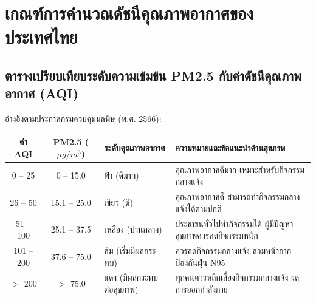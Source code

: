 \chapter{เกณฑ์การคำนวณดัชนีคุณภาพอากาศของประเทศไทย}
\label{app:appendixB}

\section{ตารางเปรียบเทียบระดับความเข้มข้น PM2.5 กับค่าดัชนีคุณภาพอากาศ (AQI)}
อ้างอิงตามประกาศกรมควบคุมมลพิษ (พ.ศ. 2566):

\begin{table}[H]
\centering\small
\begin{tabularx}{\textwidth}{c c p{} X}
\toprule
\textbf{ค่า AQI} & \textbf{PM2.5 ($\mu g/m^3$)} & \textbf{ระดับคุณภาพอากาศ} & \textbf{ความหมายและข้อแนะนำด้านสุขภาพ} \\
\midrule
0 -- 25 & 0 -- 15.0 & ฟ้า (ดีมาก) & คุณภาพอากาศดีมาก เหมาะสำหรับกิจกรรมกลางแจ้ง \\
26 -- 50 & 15.1 -- 25.0 & เขียว (ดี) & คุณภาพอากาศดี สามารถทำกิจกรรมกลางแจ้งได้ตามปกติ \\
51 -- 100 & 25.1 -- 37.5 & เหลือง (ปานกลาง) & ประชาชนทั่วไปทำกิจกรรมได้ ผู้มีปัญหาสุขภาพควรลดกิจกรรมหนัก \\
101 -- 200 & 37.6 -- 75.0 & ส้ม (เริ่มมีผลกระทบ) & ควรลดกิจกรรมกลางแจ้ง สวมหน้ากากป้องกันฝุ่น N95 \\
$>$ 200 & $>$ 75.0 & แดง (มีผลกระทบต่อสุขภาพ) & ทุกคนควรหลีกเลี่ยงกิจกรรมกลางแจ้ง งดการออกกำลังกาย \\
\bottomrule
\end{tabularx}
\end{table}
